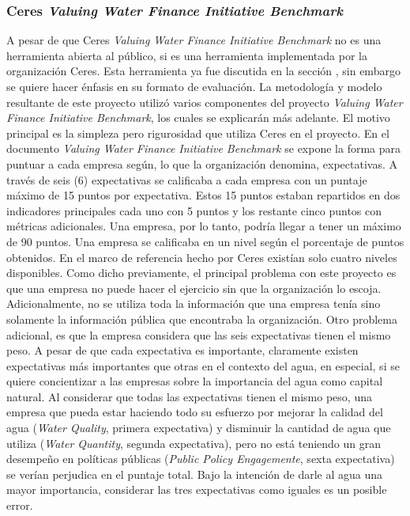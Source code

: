 \subsubsection{Ceres \textit{Valuing Water Finance Initiative Benchmark}} \label{subsubsec:ceres-benchmark}
A pesar de que Ceres \textit{Valuing Water Finance Initiative Benchmark} no es una herramienta abierta al público, si es una herramienta implementada por la organización Ceres. Esta herramienta ya fue discutida en la sección , sin embargo se quiere hacer énfasis en su formato de evaluación. La metodología y modelo resultante de este proyecto utilizó varios componentes del proyecto \textit{Valuing Water Finance Initiative Benchmark}, los cuales se explicarán más adelante. El motivo principal es la simpleza pero rigurosidad que utiliza Ceres en el proyecto. En el documento \textit{Valuing Water Finance Initiative Benchmark} \parencite{ceres-2023B} se expone la forma para puntuar a cada empresa según, lo que la organización denomina, expectativas. A través de seis (6) expectativas se calificaba a cada empresa con un puntaje máximo de 15 puntos por expectativa. Estos 15 puntos estaban repartidos en dos indicadores principales cada uno con 5 puntos y los restante cinco puntos con métricas adicionales. Una empresa, por lo tanto, podría llegar a tener un máximo de 90 puntos. Una empresa se calificaba en un nivel según el porcentaje de puntos obtenidos. En el marco de referencia hecho por Ceres existían solo cuatro niveles disponibles. Como dicho previamente, el principal problema con este proyecto es que una empresa no puede hacer el ejercicio sin que la organización lo escoja. Adicionalmente, no se utiliza toda la información que una empresa tenía sino solamente la información pública que encontraba la organización. Otro problema adicional, es que la empresa considera que las seis expectativas tienen el mismo peso. A pesar de que cada expectativa es importante, claramente existen expectativas más importantes que otras en el contexto del agua, en especial, si se quiere concientizar a las empresas sobre la importancia del agua como capital natural. Al considerar que todas las expectativas tienen el mismo peso, una empresa que pueda estar haciendo todo su esfuerzo por mejorar la calidad del agua (\textit{Water Quality}, primera expectativa) y disminuir la cantidad de agua que utiliza (\textit{Water Quantity}, segunda expectativa), pero no está teniendo un gran desempeño en políticas públicas (\textit{Public Policy Engagemente}, sexta expectativa) se verían perjudica en el puntaje total. Bajo la intención de darle al agua una mayor importancia, considerar las tres expectativas como iguales es un posible error.

